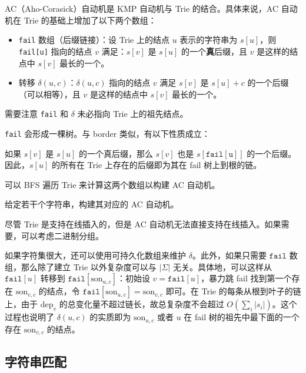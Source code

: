 AC（Aho-Corasick）自动机是 KMP 自动机与 Trie 的结合。具体来说，AC 自动机在 Trie 的基础上增加了以下两个数组：
\begin{itemize}
    \item \texttt{fail} 数组（后缀链接）：设 Trie 上的结点 $u$ 表示的字符串为 $s[u]$，则 \texttt{fail[u]} 指向的结点 $v$ 满足：$s[v]$ 是 $s[u]$ 的一个\textbf{真}后缀，且 $v$ 是这样的结点中 $s[v]$ 最长的一个。
    \item 转移 $\delta(u,c)$：$\delta(u,c)$ 指向的结点 $v$ 满足 $s[v]$ 是 $s[u]+c$ 的一个后缀（可以相等），且 $v$ 是这样的结点中 $s[v]$ 最长的一个。
\end{itemize}
\begin{remark}
    需要注意 \texttt{fail} 和 $\delta$ 未必指向 Trie 上的祖先结点。
\end{remark}

\texttt{fail} 会形成一棵树。与 border 类似，有以下性质成立：
\begin{property}
    如果 $s[v]$ 是 $s[u]$ 的一个真后缀，那么 $s[v]$ 也是 $s[\mathtt{fail[u]}]$ 的一个后缀。因此，$s[u]$ 的所有在 Trie 上存在的后缀即为其在 fail 树上到根的链。
\end{property}

可以 BFS 遍历 Trie 来计算这两个数组以构建 AC 自动机。
\begin{exercise}[AC 自动机的实现]
    给定若干个字符串，构建其对应的 AC 自动机。
\end{exercise}
\begin{remark}
    尽管 Trie 是支持在线插入的，但是 AC 自动机无法直接支持在线插入。如果需要，可以考虑二进制分组。
\end{remark}

如果字符集很大，还可以使用可持久化数组来维护 $\delta$。此外，如果只需要 $\texttt{fail}$ 数组，那么除了建立 Trie 以外复杂度可以与 $|\Sigma|$ 无关。具体地，可以这样从 $\mathtt{fail}[u]$ 转移到 $\mathtt{fail}[\mathrm{son}_{u,c}]$：初始设 $v=\mathtt{fail}[u]$，暴力跳 fail 找到第一个存在 $\mathrm{son}_{v,c}$ 的结点，令 $\mathtt{fail}[\mathrm{son}_{u,c}]=\mathrm{son}_{v,c}$ 即可。在 Trie 的每条从根到叶子的链上，由于 $\mathrm{dep}_v$ 的总变化量不超过链长，故总复杂度不会超过 $O(\sum_i |s_i|)$。这个过程也说明了 $\delta(u,c)$ 的实质即为 $\mathrm{son}_{u,c}$ 或者 $u$ 在 fail 树的祖先中最下面的一个存在 $\mathrm{son}_{v,c}$ 的结点。

\subsection{字符串匹配}



